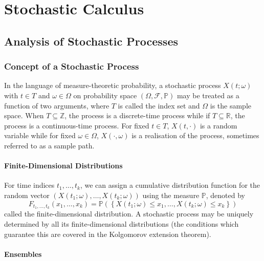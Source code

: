 \documentclass[11pt]{report} %
\begin{document}
\chapter{Stochastic Calculus}

\section{Analysis of Stochastic Processes}

\subsection{Concept of a Stochastic Process \cite{Astrom1970}}

In the language of measure-theoretic probability, a stochastic process $X\left(t; \omega\right)$ with $t \in T$ and $\omega \in \Omega$ on probability space $\left(\Omega, \mathcal{F}, \mathbb{P}\right)$ may be treated as a function of two arguments, where $T$ is called the index set and $\Omega$ is the sample space. When $T \subseteq \mathbb{Z}$, the process is a discrete-time process while if $T \subseteq \mathbb{R}$, the process is a continuous-time process. For fixed $t \in T$, $X\left(t, \cdot\right)$ is a random variable while for fixed $\omega \in \Omega$, $X\left(\cdot, \omega\right)$ is a realisation of the process, sometimes referred to as a sample path.

\subsubsection{Finite-Dimensional Distributions}

For time indices $t_{1}, \dots, t_{k}$, we can assign a cumulative distribution function for the random vector $\left(X\left(t_{1}; \omega\right), \dots, X\left(t_{k}; \omega\right)\right)$ using the measure $\mathbb{P}$, denoted by
\begin{equation}
F_{t_{1}, \dots, t_{k}}\left(x_{1}, \dots, x_{k}\right) = \mathbb{P}\left(\left\{X\left(t_{1}; \omega\right) \leq x_{1}, \dots, X\left(t_{k}; \omega\right) \leq x_{k}\right\}\right)
\end{equation}
called the finite-dimensional distribution. A stochastic process may be uniquely determined by all its finite-dimensional distributions (the conditions which guarantee this are covered in the Kolgomorov extension theorem).

\subsubsection{Ensembles}
\end{document}
